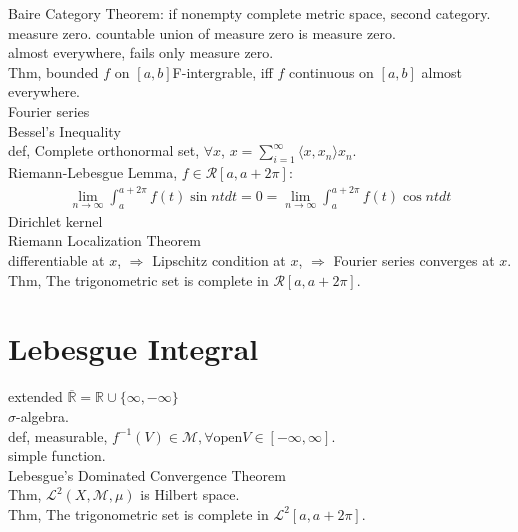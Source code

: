 \documentclass[paper=a4, fontsize=11pt]{scrartcl} %
\numberwithin{equation}{section} %
\numberwithin{figure}{section} %
\numberwithin{table}{section} %
\begin{document}
Baire Category Theorem: if nonempty complete metric space, second category.\\
measure zero. countable union of measure zero is measure zero.\\
almost everywhere, fails only measure zero.\\
Thm, bounded $f$ on $[a,b] $F-intergrable, iff $f$ continuous on $[a,b]$ almost everywhere.\\
Fourier series\\
Bessel's Inequality\\
def, Complete orthonormal set, $\forall x$, $x= \sum_{i=1}^\infty\langle x,x_n\rangle x_n$.\\
Riemann-Lebesgue Lemma, $f\in\mathcal{R}[a,a+2\pi]$:
\begin{align}
	\lim_{n\rightarrow \infty} \int_a^{a+2\pi}f(t)\sin {nt} dt=0=\lim_{n\rightarrow \infty} \int_a^{a+2\pi}f(t)\cos {nt} dt
\end{align} 
Dirichlet kernel\\
Riemann Localization Theorem\\
differentiable at $x$, $\Rightarrow$ Lipschitz condition at $x$, $\Rightarrow$ Fourier series converges at $x$.\\
Thm, The trigonometric set is complete in $\mathcal{R}[a,a+2\pi]$.\\

\section{Lebesgue Integral}
extended $\overline{\mathbb{R}} = \mathbb{R}\cup \{\infty,-\infty\}$\\
$\sigma$-algebra.\\
def, measurable, $f^{-1}(V)\in \mathcal{M}, \forall \text{open} V\in[-\infty,\infty]$.\\
simple function.\\
Lebesgue's Dominated Convergence Theorem\\
Thm, $\mathcal{L}^2(X,\mathcal{M},\mu)$ is Hilbert space.\\
Thm, The trigonometric set is complete in $\mathcal{L}^2[a,a+2\pi]$.\\
\end{document}

